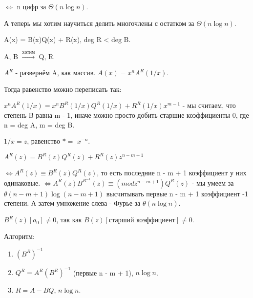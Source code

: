 \begin{itemize}
    $\Leftrightarrow$ n цифр за $\Theta(n\log n)$.
    
    А теперь мы хотим научиться делить многочлены с остатком за $\Theta(n\log n)$.
    
    A(x) = B(x)Q(x) + R(x), deg R < deg B.
    
    A, B $\xrightarrow{хотим}$ Q, R
    
    $A^R$ - развернём A, как массив. $A(x) = x^nA^R(1/x)$.
    
    Тогда равенство можно переписать так:
    
    $x^nA^R(1/x) = x^nB^R(1/x)Q^R(1/x) + R^R(1/x)x^{m - 1}$ - мы считаем, что степень B равна m - 1,  иначе можно просто добить старшие коэффициенты 0, где n = deg A, m = deg B.
    
    $1/x = z$, равенство $*=$ $x^{-n}$.
    
    $A^R(z) = B^R(z)Q^R(z) + R^R(z)z^{n - m + 1}$
    
    $\Leftrightarrow A^R(z) \equiv B^R(z)Q^R(z)$, то есть последние n - m + 1 коэффициент у них одинаковые.
    $\Leftrightarrow A^R(z)B^{{R}^{-1}}(z) \equiv (mod z^{n - m + 1}) Q^R(z)$ - мы умеем за $\theta(n - m + 1)\log(n - m + 1)$ высчитывать первые n - m + 1 коэффициент -1 степени. А затем умножение слева - Фурье за $\theta(n \log n)$.
    
    $B^R(z)[a_0] \ne 0$, так как $B(z)[\text{старший коэффициент}] \ne 0$.
    
    Алгоритм:
    \begin{enumerate}
    	\item $(B^R)^{-1}$
    	\item $Q^R = A^R(B^R)^{-1}$ (первые n - m + 1), $n\log n$.
    	\item $R = A - BQ$, $n \log n$.
    \end{enumerate}
\end{itemize}
